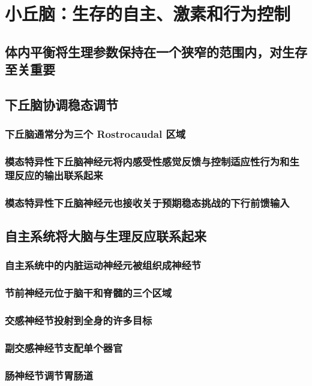 \chapter{小丘脑：生存的自主、激素和行为控制}


\section{体内平衡将生理参数保持在一个狭窄的范围内，对生存至关重要}

\section{下丘脑协调稳态调节}
\subsection{下丘脑通常分为三个 Rostrocaudal 区域}
\subsection{模态特异性下丘脑神经元将内感受性感觉反馈与控制适应性行为和生理反应的输出联系起来}
\subsection{模态特异性下丘脑神经元也接收关于预期稳态挑战的下行前馈输入}

\section{自主系统将大脑与生理反应联系起来}
\subsection{自主系统中的内脏运动神经元被组织成神经节}
\subsection{节前神经元位于脑干和脊髓的三个区域}
\subsection{交感神经节投射到全身的许多目标}
\subsection{副交感神经节支配单个器官}
\subsection{肠神经节调节胃肠道}
